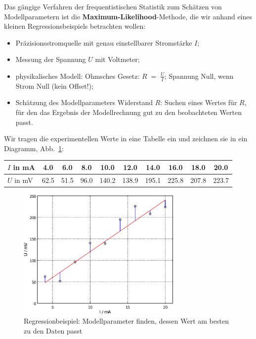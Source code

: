 \documentclass[a4paper,12pt,DIV=15]{scrartcl}
\begin{document}
Das gängige Verfahren der frequentistischen Statistik
zum Schätzen von Modellparametern ist die \textbf{Maximum-Likelihood}-Methode, die wir anhand eines kleinen
Regressionsbeispiels betrachten wollen:
\begin{itemize}
\item Präzisionsstromquelle mit genau einstellbarer Stromstärke $I$;
\item Messung der Spannung $U$ mit Voltmeter;
\item physikalisches Modell: Ohmsches Gesetz: $R \; = \; \frac{U}{I}$; Spannung Null, wenn Strom Null (kein Offset!);
\item Schätzung des Modellparameters Widerstand $R$: Suchen eines Wertes für $R$, für den das
Ergebnis der Modellrechnung \glqq gut zu den beobachteten Werten passt\grqq.
\end{itemize}
Wir tragen die experimentellen Werte
in eine Tabelle ein und zeichnen sie in ein Diagramm, Abb.~\ref{Ohm1}:

\begin{center}
\begin{tabular}{l||c|c|c|c|c|c|c|c|c}
\hline\hline
 $I$ in mA & 4.0 &     6.0 &     8.0 &    10.0 &    12.0 &    14.0 &    16.0 &    18.0 &    20.0 \\
\hline
 $U$ in mV & 62.5 &    51.5 &    96.0 &   140.2 &   138.9 &   195.1 &   225.8 &   207.8 &   223.7 \\
\hline\hline
\end{tabular}
\end{center}

\begin{figure}
\begin{center}
\includegraphics[width=80mm]{media/learn_estimation_ohm.pdf}
\caption{Regressionbeispiel: Modellparameter finden, dessen Wert am besten zu den Daten passt}
\label{Ohm1}
\end{center}
\end{figure}
\end{document}
